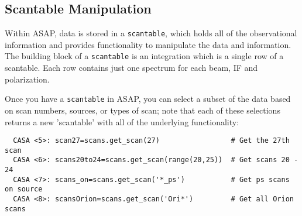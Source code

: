 %

\subsection{Scantable Manipulation}
\label{subsection:sd.asap.scantable}

Within ASAP, data is stored in a {\tt scantable}, which holds all of the
observational information and provides functionality to manipulate the
data and information. The building block of a {\tt scantable} is an
integration which is a single row of a scantable. Each row contains
just one spectrum for each beam, IF and polarization.  

Once you have a {\tt scantable} in ASAP, you can select a subset of the
data based on scan numbers, sources, or types of scan; note that each
of these selections returns a new 'scantable' with all of the 
underlying functionality: 

\small
\begin{verbatim}
  CASA <5>: scan27=scans.get_scan(27)                 # Get the 27th scan
  CASA <6>: scans20to24=scans.get_scan(range(20,25))  # Get scans 20 - 24
  CASA <7>: scans_on=scans.get_scan('*_ps')           # Get ps scans on source
  CASA <8>: scansOrion=scans.get_scan('Ori*')         # Get all Orion scans
\end{verbatim}
\normalsize

